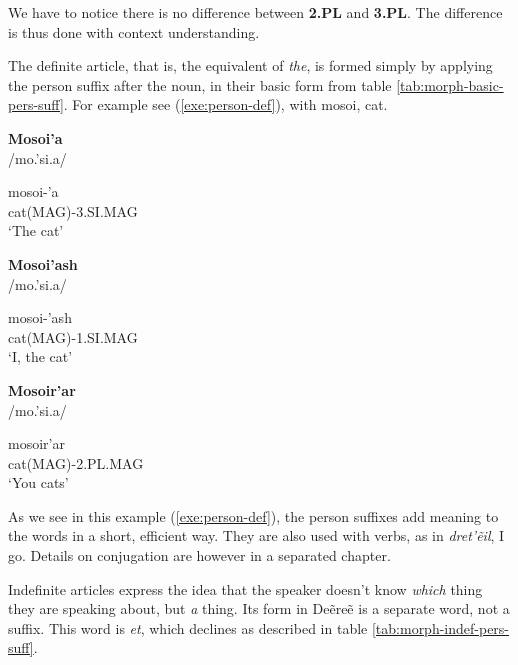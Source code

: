 We have to notice there is no difference between \textbf{2.PL} and \textbf{3.PL}. The difference is
thus done with context understanding.

The definite article, that is, the equivalent of \emph{the}, is formed simply by applying the person
suffix after the noun, in their basic form from table \ref{tab:morph-basic-pers-suff}. For example
see (\ref{exe:person-def}), with \gls{mosoi}, cat.

\begin{exe}
\ex\label{exe:person-def}
\begin{xlist}
\ex\textbf{Mosoi’a}\\
/mo.'s{\ipaO}i.a/

\gll mosoi-’a\\
cat(MAG)-3.SI.MAG\\
\trans ‘The cat’

\ex\textbf{Mosoi’ash}\\
/mo.'s{\ipaO}i.a/

\gll mosoi-’ash\\
cat(MAG)-1.SI.MAG\\
\trans ‘I, the cat’

\ex\textbf{Mosoir’ar}\\
/mo.'s{\ipaO}i{\ipaR}.a{\ipaR}/

\gll mosoir’ar\\
cat(MAG)-2.PL.MAG\\
\trans ‘You cats’
\end{xlist}
\end{exe}

As we see in this example (\ref{exe:person-def}), the person suffixes add meaning to the words in a
short, efficient way. They are also used with verbs, as in \emph{dret’ẽil}, I go. Details on
conjugation are however in a separated chapter.

Indefinite articles express the idea that the speaker doesn’t know \emph{which} thing they are
speaking about, but \emph{a} thing. Its form in Deẽreẽ is a separate word, not a suffix. This word
is \emph{et}, which declines as described in table \ref{tab:morph-indef-pers-suff}.

